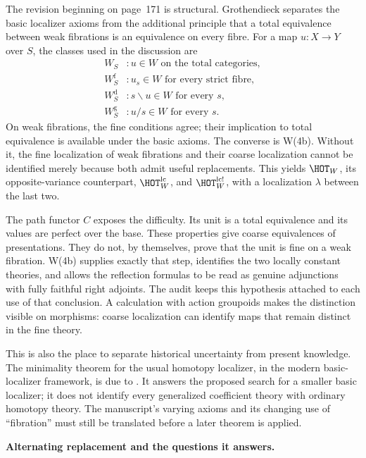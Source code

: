 The revision beginning on page~171 is structural. Grothendieck separates the basic localizer axioms from the additional principle that a total equivalence between weak fibrations is an equivalence on every fibre. For a map $u:X\to Y$ over $S$, the classes used in the discussion are
\[
\begin{array}{ll}
 W_S &: u\in W\text{ on the total categories},\\
 W_S^{\mathrm f} &: u_s\in W\text{ for every strict fibre},\\
 W_S^{\mathrm d} &: s\backslash u\in W\text{ for every }s,\\
 W_S^{\mathrm g} &: u/s\in W\text{ for every }s.
\end{array}
\]
On weak fibrations, the fine conditions agree; their implication to total equivalence is available under the basic axioms. The converse is W(4b). Without it, the fine localization of weak fibrations and their coarse localization cannot be identified merely because both admit useful replacements. This yields $\HOT_W$, its opposite-variance counterpart, $\HOT_W^{\mathrm{lc}}$, and $\HOT_W^{\mathrm{lc}!}$, with a localization $\lambda$ between the last two.

The path functor $C$ exposes the difficulty. Its unit is a total equivalence and its values are perfect over the base. These properties give coarse equivalences of presentations. They do not, by themselves, prove that the unit is fine on a weak fibration. W(4b) supplies exactly that step, identifies the two locally constant theories, and allows the reflection formulas to be read as genuine adjunctions with fully faithful right adjoints. The audit keeps this hypothesis attached to each use of that conclusion. A calculation with action groupoids makes the distinction visible on morphisms: coarse localization can identify maps that remain distinct in the fine theory.

This is also the place to separate historical uncertainty from present knowledge. The minimality theorem for the usual homotopy localizer, in the modern basic-localizer framework, is due to \citet{Cisinski2004Minimal}. It answers the proposed search for a smaller basic localizer; it does not identify every generalized coefficient theory with ordinary homotopy theory. The manuscript's varying axioms and its changing use of ``fibration'' must still be translated before a later theorem is applied.

\medskip\noindent\textbf{Alternating replacement and the questions it answers.}

